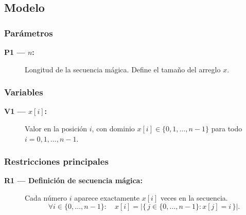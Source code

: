 

\subsection{Modelo}\label{sec:01-secuencias-magicas-modelo}

\subsubsection*{Parámetros}
\begin{description}
  \item[\textbf{P1 — \(n\):}] Longitud de la secuencia mágica. Define el tamaño del arreglo \(x\).
\end{description}

\subsubsection*{Variables}
\begin{description}
  \item[\textbf{V1 — \(x[i]\):}] Valor en la posición \(i\), con dominio \(x[i] \in \{0, 1, \dots, n-1\}\) para todo \(i = 0, 1, \dots, n-1\).
\end{description}

\subsubsection*{Restricciones principales}
\begin{description}
  \item[\textbf{R1 — Definición de secuencia mágica:}] Cada número \(i\) aparece exactamente \(x[i]\) veces en la secuencia. 
  \[
  \forall i \in \{0, \dots, n-1\}:\quad x[i] = \bigl|\{\, j \in \{0, \dots, n-1\} : x[j] = i \,\}\bigr|.
  \]
\end{description}

